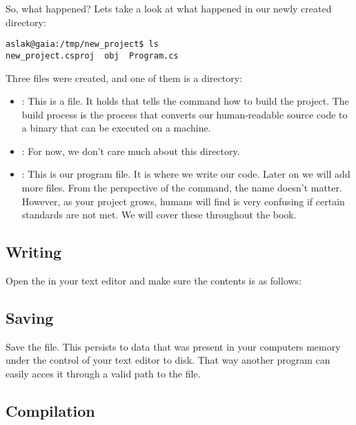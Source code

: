 So, what happened? Lets take a look at what happened in our newly created directory:

\begin{verbatim}
aslak@gaia:/tmp/new_project$ ls
new_project.csproj  obj  Program.cs
\end{verbatim}

Three files were created, and one of them is a directory:
\begin{itemize}
  \item {}: This is a  file. It holds  that tells the  command how to build the project. The build process is the process that converts our human-readable source code to a binary that can be executed on a machine. %
  \item {}: For now, we don't care much about this directory.
  \item {}: This is our program file. It is where we write our code. Later on we will add more files. From the perspective of the  command, the name doesn't matter. However, as your project grows, humans will find is very confusing if certain standards are not met. We will cover these throughout the book.
\end{itemize}

\subsection{Writing}

Open the  in your text editor and make sure the contents is as follows:


\subsection{Saving}

Save the file. This persists to data that was present in your computers memory under the control of your text editor to disk. That way another program can easily acces it through a valid path to the file.

\subsection{Compilation}

